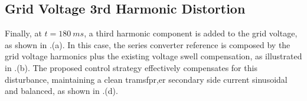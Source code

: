 \subsection{Grid Voltage 3rd Harmonic Distortion}
Finally, at $t = 180\ ms$, a third harmonic component is added to the grid voltage, as shown in .(a). In this case, the series converter reference is composed by the grid voltage harmonics plus the existing voltage swell compensation, as illustrated in .(b). The proposed control strategy effectively compensates for this disturbance, maintaining a clean tramsfpr,er secondary side current sinusoidal and balanced, as shown in .(d).